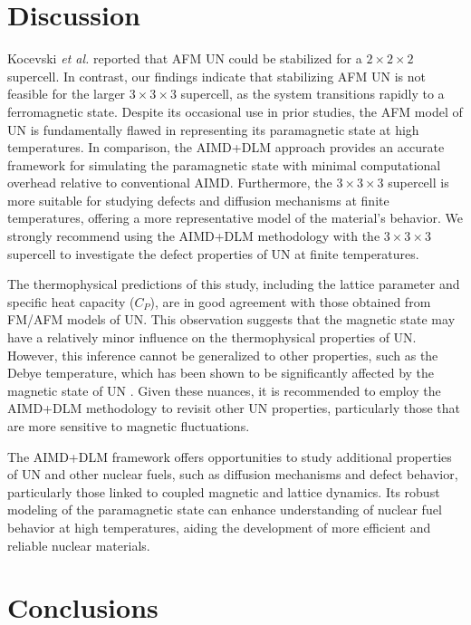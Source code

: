\documentclass[preprint, 12pt]{elsarticle}
\newcommand{\?}{\stackrel{?}{=}}
\begin{document}
\FloatBarrier

\section{Discussion}

Kocevski \textit{et al.} \cite{Kocevski2023} reported that AFM UN could be stabilized for a \( 2 \times 2 \times 2 \) supercell. In contrast, our findings indicate that stabilizing AFM UN is not feasible for the larger \( 3 \times 3 \times 3 \) supercell, as the system transitions rapidly to a ferromagnetic state. Despite its occasional use in prior studies, the AFM model of UN is fundamentally flawed in representing its paramagnetic state at high temperatures. In comparison, the AIMD+DLM approach provides an accurate framework for simulating the paramagnetic state with minimal computational overhead relative to conventional AIMD. Furthermore, the \( 3 \times 3 \times 3 \) supercell is more suitable for studying defects and diffusion mechanisms at finite temperatures, offering a more representative model of the material’s behavior. We strongly recommend using the AIMD+DLM methodology with the \( 3 \times 3 \times 3 \) supercell to investigate the defect properties of UN at finite temperatures.

The thermophysical predictions of this study, including the lattice parameter and specific heat capacity (\(C_P\)), are in good agreement with those obtained from FM/AFM models of UN. This observation suggests that the magnetic state may have a relatively minor influence on the thermophysical properties of UN. However, this inference cannot be generalized to other properties, such as the Debye temperature, which has been shown to be significantly affected by the magnetic state of UN \cite{Whaley1969,AbdulHameed2024}. Given these nuances, it is recommended to employ the AIMD+DLM methodology to revisit other UN properties, particularly those that are more sensitive to magnetic fluctuations.

The AIMD+DLM framework offers opportunities to study additional properties of UN and other nuclear fuels, such as diffusion mechanisms and defect behavior, particularly those linked to coupled magnetic and lattice dynamics. Its robust modeling of the paramagnetic state can enhance understanding of nuclear fuel behavior at high temperatures, aiding the development of more efficient and reliable nuclear materials.

\section{Conclusions}
\end{document}
